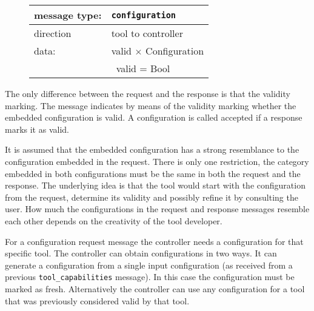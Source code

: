 \documentclass{article}
\newcommand{\msg}[1]{\texttt{#1}}
\begin{document}
   \begin{figure}[H]
    \begin{center}
     \begin{tabular}{|ll|}
      \hline
       message type:   & \msg{configuration} \\
      \hline
       direction       & tool to controller \\
       data:           & valid $\times$ Configuration \\
                       & \ valid = Bool \\
      \hline
     \end{tabular}
    \end{center}
   \end{figure}

   \noindent The only difference between the request and the response is that
   the validity marking. The message indicates by means of the validity marking
   whether the embedded configuration is valid. A configuration is called
   accepted if a response marks it as valid.

   It is assumed that the embedded configuration has a strong resemblance to
   the configuration embedded in the request. There is only one restriction,
   the category embedded in both configurations must be the same in both the
   request and the response. The underlying idea is that the tool would start
   with the configuration from the request, determine its validity and possibly
   refine it by consulting the user. How much the configurations in the request
   and response messages resemble each other depends on the creativity of the
   tool developer.

   For a configuration request message the controller needs a configuration for
   that specific tool.  The controller can obtain configurations in two ways.
   It can generate a configuration from a single input configuration (as
   received from a previous \msg{tool\_capabilities} message). In this case the
   configuration must be marked as fresh. Alternatively the controller can use
   any configuration for a tool that was previously considered valid by that
   tool.

\end{document}
